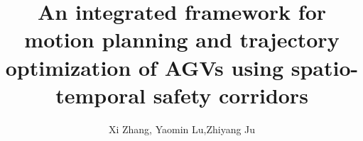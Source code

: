 %
% 



\setcounter{section}{0}
\title{An integrated framework for motion planning and trajectory optimization of AGVs using spatio-temporal safety corridors}


\author{Xi Zhang, Yaomin Lu,Zhiyang Ju}

%


%

\maketitle
